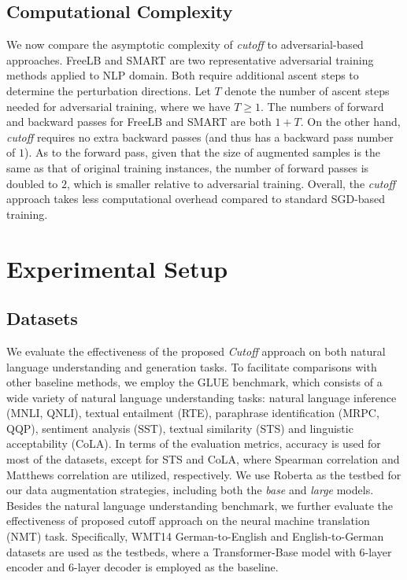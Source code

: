 \documentclass[11pt,a4paper]{article}
\begin{document}
\subsection{Computational Complexity}
\label{sec:computation}
We now compare the asymptotic complexity of \emph{cutoff} to adversarial-based approaches. FreeLB \cite{zhu2019freelb} and SMART \cite{jiang2019smart} are two representative adversarial training methods applied to NLP domain. Both require additional ascent steps to determine the perturbation directions. Let $T$ denote the number of ascent steps needed for adversarial training, where we have $T \geq 1$. The numbers of forward and backward passes for FreeLB and SMART are both $1+T$. On the other hand, \emph{cutoff} requires no extra backward passes (and thus has a backward pass number of $1$). As to the forward pass, given that the size of augmented samples is the same as that of original training instances, the number of forward passes is doubled to $2$, which is smaller relative to adversarial training. Overall, the \emph{cutoff} approach takes less computational overhead compared to standard SGD-based training.

\section{Experimental Setup}
\subsection{Datasets}
We evaluate the effectiveness of the proposed \emph{Cutoff} approach on both natural language understanding and generation tasks.
To facilitate comparisons with other baseline methods, we employ the GLUE benchmark, which consists of a wide variety of natural language understanding tasks: natural language inference (MNLI, QNLI), textual entailment (RTE), paraphrase identification (MRPC, QQP), sentiment analysis (SST), textual similarity (STS) and linguistic acceptability (CoLA). In terms of the evaluation metrics, accuracy is used for most of the datasets, except for STS and CoLA, where Spearman correlation and Matthews correlation are utilized, respectively. We use Roberta \cite{liu2019roberta} as the testbed for our data augmentation strategies, including both the \emph{base} and \emph{large} models.
Besides the natural language understanding benchmark, we further evaluate the effectiveness of proposed cutoff approach on the neural machine translation (NMT) task. Specifically, WMT14 German-to-English and English-to-German datasets are used as the testbeds, where a Transformer-Base model with 6-layer encoder and 6-layer decoder is employed as the baseline.
\end{document}
